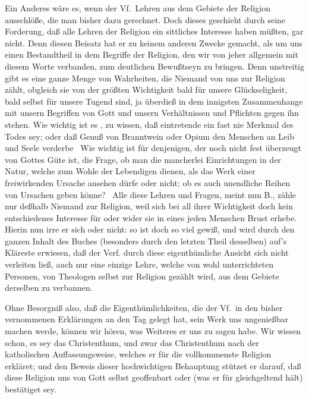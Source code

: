 Ein Anderes wäre es, wenn der Vf.\ Lehren aus dem Gebiete der Religion ausschlöße, die man bisher dazu gerechnet. Doch dieses geschieht durch seine Forderung, daß alle  Lehren der Religion ein sittliches Interesse haben müßten, gar nicht. Denn diesen Beisatz hat er zu keinem anderen Zwecke gemacht, als um uns einen Bestandtheil in dem Begriffe der Religion, den wir von jeher allgemein mit diesem Worte verbanden, zum deutlichen Bewußtseyn zu bringen. Denn unstreitig gibt es eine ganze Menge von Wahrheiten, die Niemand von uns zur Religion zählt, obgleich sie von der größten Wichtigkeit bald für unsere Glückseligkeit, bald selbst für unsere Tugend sind, ja überdieß in dem innigsten Zusammenhange mit unsern Begriffen von Gott und unsern Verhältnissen und Pflichten gegen ihn stehen. Wie wichtig ist es \zB , zu wissen, daß eintretende  ein fast nie  Merkmal des Todes sey; oder daß  Genuß von Branntwein oder Opium den Menschen an Leib und Seele verderbe \usw\ Wie wichtig ist für denjenigen, der noch nicht fest überzeugt von Gottes Güte ist, die Frage, ob man die mancherlei Einrichtungen in der Natur, welche zum Wohle der Lebendigen dienen, als das Werk einer freiwirkenden Ursache ansehen dürfe oder nicht; ob es auch unendliche Reihen von Ursachen geben könne? \umA\  Alle diese Lehren und Fragen, meint nun B., zähle nur deßhalb Niemand zur Religion, weil sich bei all ihrer Wichtigkeit doch kein entschiedenes Interesse für oder wider sie in eines jeden Menschen Brust erhebe. Hierin nun irre er sich oder nicht: so ist doch so viel gewiß, und wird durch den ganzen Inhalt des Buches (besonders durch den letzten Theil desselben) auf's Kläreste erwiesen, daß der Verf. durch diese eigenthümliche Ansicht sich nicht verleiten ließ, auch nur eine einzige Lehre, welche von wohl unterrichteten Personen, von Theologen selbst zur Religion gezählt wird, aus dem Gebiete derselben zu verbannen. \par 
Ohne Besorgniß also, daß die Eigenthümlichkeiten, die der Vf.\ in den bisher vernommenen Erklärungen an den Tag gelegt hat, sein Werk uns ungenießbar machen werde, können wir hören, was Weiteres er uns zu sagen habe. Wir wissen schon, es sey das Christenthum, und zwar das Christenthum nach der katholischen Auffassungsweise, welches er für die vollkommenste Religion erkläret; und den Beweis dieser hochwichtigen Behauptung stützet er darauf, daß diese  Religion uns von Gott selbst geoffenbart oder (was er für gleichgeltend hält) bestätiget sey. \par 
